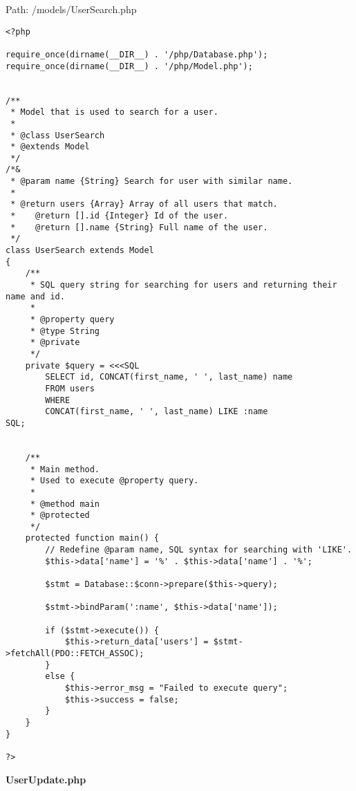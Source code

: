 Path: /models/UserSearch.php
{\scriptsize
\begin{lstlisting}
<?php

require_once(dirname(__DIR__) . '/php/Database.php');
require_once(dirname(__DIR__) . '/php/Model.php');


/**
 * Model that is used to search for a user.
 *
 * @class UserSearch
 * @extends Model
 */
/*&
 * @param name {String} Search for user with similar name.
 *
 * @return users {Array} Array of all users that match.
 *    @return [].id {Integer} Id of the user.
 *    @return [].name {String} Full name of the user.
 */
class UserSearch extends Model
{
	/**
	 * SQL query string for searching for users and returning their name and id.
	 *
	 * @property query
	 * @type String
	 * @private
	 */
	private $query = <<<SQL
		SELECT id, CONCAT(first_name, ' ', last_name) name
		FROM users
		WHERE
		CONCAT(first_name, ' ', last_name) LIKE :name
SQL;


	/**
	 * Main method.
	 * Used to execute @property query.
	 *
	 * @method main
	 * @protected
	 */
	protected function main() {
		// Redefine @param name, SQL syntax for searching with 'LIKE'.
		$this->data['name'] = '%' . $this->data['name'] . '%';

		$stmt = Database::$conn->prepare($this->query);
		
		$stmt->bindParam(':name', $this->data['name']);

		if ($stmt->execute()) {
			$this->return_data['users'] = $stmt->fetchAll(PDO::FETCH_ASSOC);
		}
		else {
			$this->error_msg = "Failed to execute query";
			$this->success = false;
		}
	}
}

?>
\end{lstlisting}
}
\textbf{UserUpdate.php}\label{UserUpdate.php}


